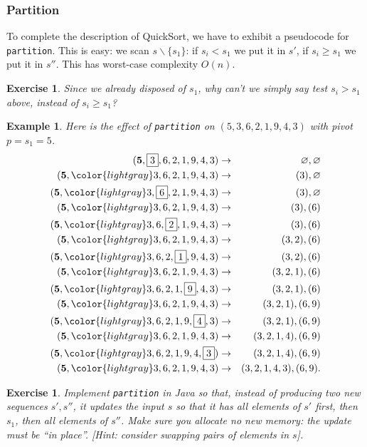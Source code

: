 \documentclass[a4paper]{book}
\theoremstyle{changebreak}                %
\newtheorem{eg}[result]{Example}
\newtheorem{ex}[result]{Exercise}
\begin{document}
\subsubsection{Partition}
To complete the description of {\sc QuickSort}, we have to exhibit a
pseudocode for {\tt partition}. This is easy: we scan $s\smallsetminus
\{s_1\}$: if $s_i<s_1$ we put it in $s'$, if $s_i\ge s_1$ we put it in
$s''$. This has worst-case complexity $O(n)$. 

\begin{ex}
Since we already disposed of $s_1$, why can't we simply say test
$s_i>s_1$ above, instead of $s_i\ge s_1$?
\end{ex}

\begin{eg}
Here is the effect of {\tt partition} on $(5,3,6,2,1,9,4,3)$ with
pivot $p=s_1=5$.
\begin{eqnarray*}
(\mbox{\bf 5},\fbox{$3$},6,2,1,9,4,3)&\to&\varnothing,\varnothing \\
(\mbox{\bf 5},{\color{lightgray}3},6,2,1,9,4,3)&\to&(3),\varnothing\\
(\mbox{\bf 5},{\color{lightgray}3},\fbox{$6$},2,1,9,4,3)&\to&(3),\varnothing\\
(\mbox{\bf 5},{\color{lightgray}3,6},2,1,9,4,3)&\to&(3),(6) \\
(\mbox{\bf 5},{\color{lightgray}3,6},\fbox{$2$},1,9,4,3)&\to&(3),(6) \\
(\mbox{\bf 5},{\color{lightgray}3,6,2},1,9,4,3)&\to&(3,2),(6) \\
(\mbox{\bf 5},{\color{lightgray}3,6,2},\fbox{$1$},9,4,3)&\to&(3,2),(6)\\
(\mbox{\bf 5},{\color{lightgray}3,6,2,1},9,4,3)&\to&(3,2,1),(6)\\
(\mbox{\bf 5},{\color{lightgray}3,6,2,1},\fbox{$9$},4,3)&\to&(3,2,1),(6)\\
(\mbox{\bf 5},{\color{lightgray}3,6,2,1,9},4,3)&\to&(3,2,1),(6,9)\\
(\mbox{\bf 5},{\color{lightgray}3,6,2,1,9},\fbox{$4$},3)&\to&(3,2,1),(6,9)\\
(\mbox{\bf 5},{\color{lightgray}3,6,2,1,9,4},3)&\to&(3,2,1,4),(6,9)\\
(\mbox{\bf 5},{\color{lightgray}3,6,2,1,9,4},\fbox{$3$})&\to&(3,2,1,4),(6,9)\\
(\mbox{\bf 5},{\color{lightgray}3,6,2,1,9,4,3})&\to&(3,2,1,4,3),(6,9).
\end{eqnarray*}
\end{eg}

\begin{ex}
Implement {\tt partition} in Java so that, instead of producing two
new sequences $s',s''$, it updates the input $s$ so that it has all
elements of $s'$ first, then $s_1$, then all elements of $s''$. Make
sure you allocate no new memory: the update must be ``in
place''. [{\it Hint}: consider swapping pairs of elements in $s$].
\end{ex}
\end{document}
